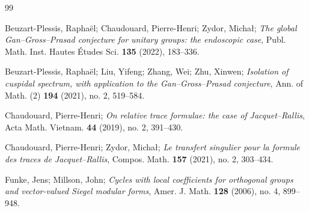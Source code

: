 \documentclass[reqno, 11pt]{amsart} %
\numberwithin{equation}{section}
\theoremstyle{plain}
\theoremstyle{definition}
\theoremstyle{remark}
\begin{document}

\begin{thebibliography}{99}
%
%
%

Beuzart-Plessis, Raphaël; Chaudouard, Pierre-Henri; Zydor, Michał; \emph{The global Gan--Gross--Prasad conjecture for unitary groups: the endoscopic case}, Publ. Math. Inst. Hautes Études Sci. \textbf{135} (2022), 183--336.

Beuzart-Plessis, Raphaël; Liu, Yifeng; Zhang, Wei; Zhu, Xinwen; \emph{Isolation of cuspidal spectrum, with application to the Gan--Gross--Prasad conjecture},
Ann. of Math. (2) \textbf{194} (2021), no. 2, 519--584.

%
%

	
Chaudouard, Pierre-Henri; \emph{On relative trace formulae: the case of Jacquet--Rallis}, Acta Math. Vietnam. \textbf{44} (2019), no. 2, 391--430.

Chaudouard, Pierre-Henri; Zydor, Michał; \emph{Le transfert singulier pour la formule des traces de Jacquet--Rallis}, Compos. Math. \textbf{157} (2021), no. 2, 303--434.

Funke, Jens; Millson, John; \emph{Cycles with local coefficients for orthogonal groups and vector-valued Siegel modular forms}, Amer. J. Math. \textbf{128} (2006), no. 4, 899--948.


\end{thebibliography}
\end{document}
